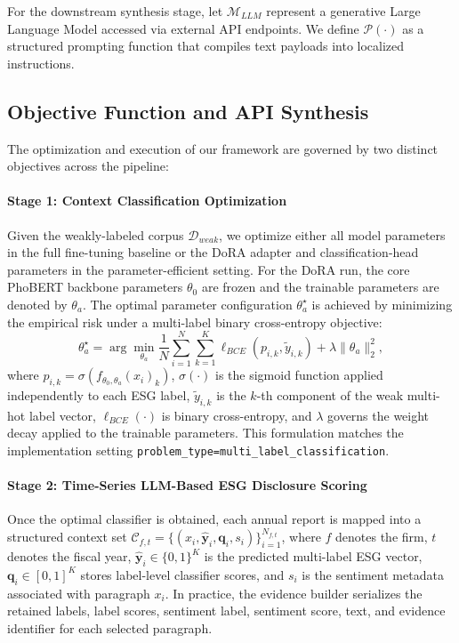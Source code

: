 \documentclass{article}
\theoremstyle{plain}
\theoremstyle{definition}
\theoremstyle{remark}
\begin{document}
For the downstream synthesis stage, let $\mathcal{M}_{LLM}$ represent a generative Large Language Model accessed via external API endpoints. We define $\mathcal{P}(\cdot)$ as a structured prompting function that compiles text payloads into localized instructions.

\subsection{Objective Function and API Synthesis}
The optimization and execution of our framework are governed by two distinct objectives across the pipeline:

\paragraph{Stage 1: Context Classification Optimization}
Given the weakly-labeled corpus $\mathcal{D}_{weak}$, we optimize either all model parameters in the full fine-tuning baseline or the DoRA adapter and classification-head parameters in the parameter-efficient setting. For the DoRA run, the core PhoBERT backbone parameters $\theta_0$ are frozen and the trainable parameters are denoted by $\theta_a$. The optimal parameter configuration $\theta_a^{\star}$ is achieved by minimizing the empirical risk under a multi-label binary cross-entropy objective:
\begin{equation}
    \theta_a^{\star} =
    \arg\min_{\theta_a}
    \frac{1}{N}\sum_{i=1}^{N}\sum_{k=1}^{K}
    \ell_{BCE}\left(p_{i,k}, \tilde{y}_{i,k}\right)
    + \lambda \| \theta_a \|_2^2,
    \label{eq:stage1_dora_objective}
\end{equation}
where $p_{i,k}=\sigma(f_{\theta_0,\theta_a}(x_i)_k)$, $\sigma(\cdot)$ is the sigmoid function applied independently to each ESG label, $\tilde{y}_{i,k}$ is the $k$-th component of the weak multi-hot label vector, $\ell_{BCE}(\cdot)$ is binary cross-entropy, and $\lambda$ governs the weight decay applied to the trainable parameters. This formulation matches the implementation setting \texttt{problem\_type=multi\_label\_classification}.

\paragraph{Stage 2: Time-Series LLM-Based ESG Disclosure Scoring}
Once the optimal classifier is obtained, each annual report is mapped into a structured context set $\mathcal{C}_{f,t} = \{(x_i, \hat{\mathbf{y}}_i, \mathbf{q}_i, s_i)\}_{i=1}^{N_{f,t}}$, where $f$ denotes the firm, $t$ denotes the fiscal year, $\hat{\mathbf{y}}_i \in \{0,1\}^{K}$ is the predicted multi-label ESG vector, $\mathbf{q}_i \in [0,1]^{K}$ stores label-level classifier scores, and $s_i$ is the sentiment metadata associated with paragraph $x_i$. In practice, the evidence builder serializes the retained labels, label scores, sentiment label, sentiment score, text, and evidence identifier for each selected paragraph.
\end{document}

